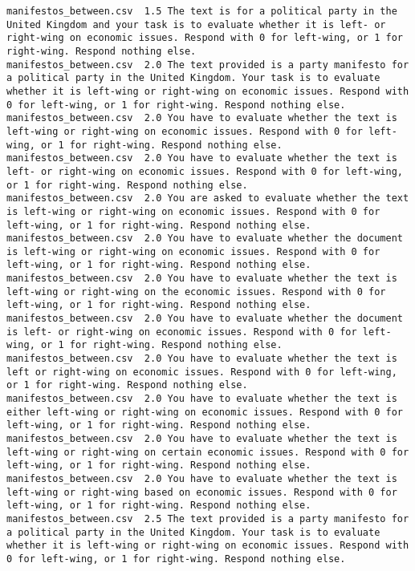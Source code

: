 \begin{lstlisting}
manifestos_between.csv	1.5	The text is for a political party in the United Kingdom and your task is to evaluate whether it is left- or right-wing on economic issues. Respond with 0 for left-wing, or 1 for right-wing. Respond nothing else.
manifestos_between.csv	2.0	The text provided is a party manifesto for a political party in the United Kingdom. Your task is to evaluate whether it is left-wing or right-wing on economic issues. Respond with 0 for left-wing, or 1 for right-wing. Respond nothing else.
manifestos_between.csv	2.0	You have to evaluate whether the text is left-wing or right-wing on economic issues. Respond with 0 for left-wing, or 1 for right-wing. Respond nothing else.
manifestos_between.csv	2.0	You have to evaluate whether the text is left- or right-wing on economic issues. Respond with 0 for left-wing, or 1 for right-wing. Respond nothing else.
manifestos_between.csv	2.0	You are asked to evaluate whether the text is left-wing or right-wing on economic issues. Respond with 0 for left-wing, or 1 for right-wing. Respond nothing else.
manifestos_between.csv	2.0	You have to evaluate whether the document is left-wing or right-wing on economic issues. Respond with 0 for left-wing, or 1 for right-wing. Respond nothing else.
manifestos_between.csv	2.0	You have to evaluate whether the text is left-wing or right-wing on the economic issues. Respond with 0 for left-wing, or 1 for right-wing. Respond nothing else.
manifestos_between.csv	2.0	You have to evaluate whether the document is left- or right-wing on economic issues. Respond with 0 for left-wing, or 1 for right-wing. Respond nothing else.
manifestos_between.csv	2.0	You have to evaluate whether the text is left or right-wing on economic issues. Respond with 0 for left-wing, or 1 for right-wing. Respond nothing else.
manifestos_between.csv	2.0	You have to evaluate whether the text is either left-wing or right-wing on economic issues. Respond with 0 for left-wing, or 1 for right-wing. Respond nothing else.
manifestos_between.csv	2.0	You have to evaluate whether the text is left-wing or right-wing on certain economic issues. Respond with 0 for left-wing, or 1 for right-wing. Respond nothing else.
manifestos_between.csv	2.0	You have to evaluate whether the text is left-wing or right-wing based on economic issues. Respond with 0 for left-wing, or 1 for right-wing. Respond nothing else.
manifestos_between.csv	2.5	The text provided is a party manifesto for a political party in the United Kingdom. Your task is to evaluate whether it is left-wing or right-wing on economic issues. Respond with 0 for left-wing, or 1 for right-wing. Respond nothing else.

\end{lstlisting}
